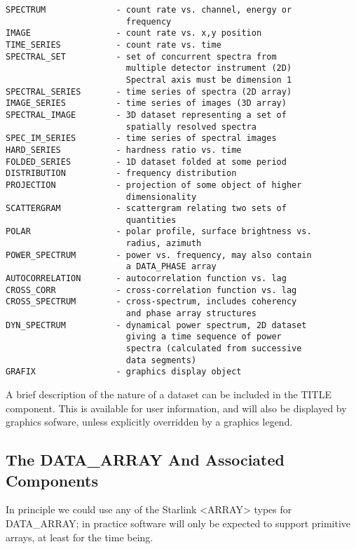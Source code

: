 \begin{verbatim}
SPECTRUM              - count rate vs. channel, energy or 
                        frequency 
IMAGE                 - count rate vs. x,y position 
TIME_SERIES           - count rate vs. time
SPECTRAL_SET          - set of concurrent spectra from 
                        multiple detector instrument (2D)
                        Spectral axis must be dimension 1 
SPECTRAL_SERIES       - time series of spectra (2D array)
IMAGE_SERIES          - time series of images (3D array)
SPECTRAL_IMAGE        - 3D dataset representing a set of
                        spatially resolved spectra 
SPEC_IM_SERIES        - time series of spectral images
HARD_SERIES           - hardness ratio vs. time
FOLDED_SERIES         - 1D dataset folded at some period 
DISTRIBUTION          - frequency distribution
PROJECTION            - projection of some object of higher
                        dimensionality 
SCATTERGRAM           - scattergram relating two sets of
                        quantities
POLAR                 - polar profile, surface brightness vs.
                        radius, azimuth 
POWER_SPECTRUM        - power vs. frequency, may also contain
                        a DATA_PHASE array 
AUTOCORRELATION       - autocorrelation function vs. lag
CROSS_CORR            - cross-correlation function vs. lag
CROSS_SPECTRUM        - cross-spectrum, includes coherency
                        and phase array structures 
DYN_SPECTRUM          - dynamical power spectrum, 2D dataset
                        giving a time sequence of power
                        spectra (calculated from successive
                        data segments) 
GRAFIX                - graphics display object
\end{verbatim}

A brief description of the nature of a dataset can be included in  the
TITLE  component.   This  is  available for user information, and will
also be displayed by graphics sofware, unless explicitly overridden by
a graphics legend.

\subsection{The DATA\_ARRAY And Associated Components}

In principle we could use  any  of  the  Starlink  <ARRAY>  types  for
DATA\_ARRAY;  in  practice  software  will  only be expected to support
primitive arrays, at least for the time being.

